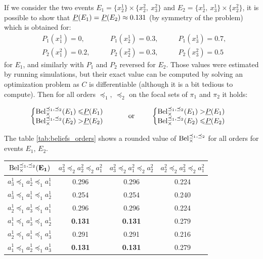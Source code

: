 \begin{example}
If we consider the two events $E_1=\{x^1_2\}\times\{x^2_2,~x^2_3\}$ and $E_2=\{x^1_2,~x^1_3\}\times\{x^2_2\}$, it is possible to show that ${\underline{P}}(E_1)={\underline{P}}(E_2)\approx0.131$ (by symmetry of the problem) which is obtained for:
\begin{align*}
    &P_1(x^1_1)=0, \qquad&P_1(x^1_2)=0.3, \qquad&P_1(x^1_3)=0.7,\\
    &P_2(x^2_1)=0.2, \qquad&P_2(x^2_2)=0.3, \qquad&P_2(x^2_3)=0.5
\end{align*}
for $E_1$, and similarly with $P_1$ and $P_2$ reversed for $E_2$. Those values were estimated by running simulations, but their exact value can be computed by solving an optimization problem as $C$ is differentiable (although it is a bit tedious to compute). Then for all orders $\preceq_1,~\preceq_2$ on the focal sets of $\pi_1$ and $\pi_2$ it holds:

 \begin{align*}
    \begin{cases}
        \begin{split}
            {\mathrm{Bel}}_\times^{\preceq_1,\preceq_2}(E_1) \leqslant& {\underline{P}}(E_1)\\
            {\mathrm{Bel}}_\times^{\preceq_1,\preceq_2}(E_2) >& {\underline{P}}(E_2)
        \end{split}
    \end{cases}
    \qquad\text{ or }\qquad
    \begin{cases}
        \begin{split}
            {\mathrm{Bel}}_\times^{\preceq_1,\preceq_2}(E_1) >& {\underline{P}}(E_1)\\
            {\mathrm{Bel}}_\times^{\preceq_1,\preceq_2}(E_2) \leqslant& {\underline{P}}(E_2)
        \end{split}
    \end{cases}
\end{align*}

The table \ref{tab:beliefs_orders} shows a rounded value of ${\mathrm{Bel}}^{\preceq_1,\preceq_2}_\times$ for all orders for events $E_1$, $E_2$.

\begin{center}
\begin{tabular}{|c||c|c|c|}
\hline
${\mathrm{Bel}}^{\preceq_1,\preceq_2}_\times(\mathbf{E_1})$ & $a^2_3\preceq_2a^2_2\preceq_2a^2_1$ & $a^2_3\preceq_2a^2_1\preceq_2a^2_2$ & $a^2_2\preceq_2a^2_3\preceq_2a^2_1$ \\ \hline\hline
$a^1_3\preceq_1a^1_2\preceq_1a^1_1$ & 0.296 & 0.296 & 0.224 \\ \hline
$a^1_3\preceq_1a^1_1\preceq_1a^1_2$ & 0.254 & 0.254 & 0.240 \\ \hline
$a^1_2\preceq_1a^1_3\preceq_1a^1_1$ & 0.296 & 0.296 & 0.224 \\ \hline
$a^1_1\preceq_1a^1_3\preceq_1a^1_2$ & \textbf{0.131} & \textbf{0.131} & 0.279 \\ \hline
$a^1_2\preceq_1a^1_1\preceq_1a^1_3$ & 0.291 & 0.291 & 0.216 \\ \hline
$a^1_1\preceq_1a^1_2\preceq_1a^1_3$ & \textbf{0.131} & \textbf{0.131} & 0.279 \\ \hline
\end{tabular}


\end{center}
\end{example}
